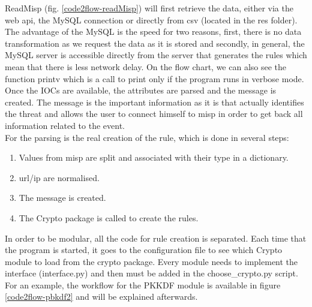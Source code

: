 \documentclass{eplmastersthesis}
\begin{document}
ReadMisp (fig. \ref{code2flow-readMisp}) will first retrieve the data, either via the web \gls{api}, the MySQL connection or directly from \gls{csv} (located in the res folder). The advantage of the MySQL is the speed for two reasons, first, there is no data transformation as we request the data as it is stored and secondly, in general, the MySQL server is accessible directly from the server that generates the rules which mean that there is less network delay.
On the flow chart, we can also see the function printv which is a call to print only if the program runs in verbose mode.
Once the IOCs are available, the attributes are parsed and the message is created. The message is the important information as it is that actually identifies the threat and allows the user to connect himself to \gls{misp} in order to get back all information related to the event.\\
For the parsing is the real creation of the rule, which is done in several steps:

\begin{enumerate}
\item Values from \gls{misp} are split and associated with their type in a dictionary.
\item \gls{url}/\gls{ip} are normalised.
\item The message is created.
\item The Crypto package is called to create the rules.
\end{enumerate}

In order to be modular, all the code for rule creation is separated. Each time that the program is started, it goes to the configuration file to see which Crypto module to load from the crypto package.
Every module needs to implement the interface (interface.py) and then must be added in the choose\_crypto.py script.
For an example, the workflow for the PKKDF module is available in figure \ref{code2flow-pbkdf2} and will be explained afterwards.
\end{document}
